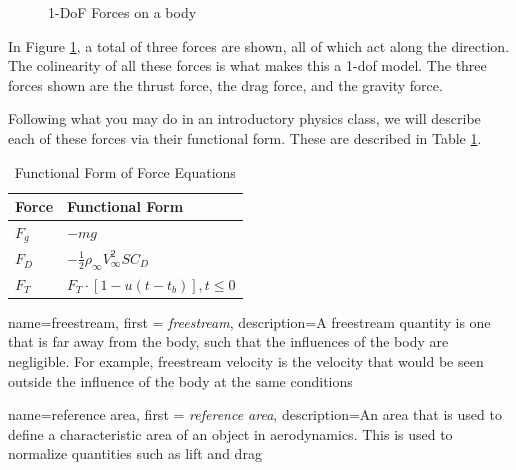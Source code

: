 \documentclass[12pt]{report}
\begin{document}
\begin{figure}[ht]
    \caption{1-DoF Forces on a body}
    \label{Figure 1}
\end{figure}

In Figure \ref{Figure 1}, a total of three forces are shown, all of which act along the  direction. The colinearity of all these forces is what makes this a 1-\gls{dof} model. The three forces shown are the thrust force, the drag force, and the gravity force.

Following what you may do in an introductory physics class, we will describe each of these forces via their functional form. These are described in Table \ref{Force Equations 1 DoF}. 

\begin{table}
\centering
\caption{Functional Form of Force Equations}
\label{Force Equations 1 DoF}
\begin{tabular}{l | l}
Force & Functional Form \\
\hline
 $F_g$&  $-mg$\\
 $F_D$&  $-\frac{1}{2} \rho_{\infty} V^2_{\infty}SC_D$\\
 $F_T$&  $F_T\cdot[1-u(t-t_b)], t\le0$\\

\end{tabular}

\end{table}
{
    name=freestream,
    first = {\textit{freestream}},
    description={A freestream quantity is one that is far away from the body, such that the influences of the body are negligible. For example, freestream velocity is the velocity that would be seen outside the influence of the body at the same conditions}
}

{
    name=reference area,
    first = \textit{reference area},
    description={An area that is used to define a characteristic area of an object in aerodynamics. This is used to normalize quantities such as lift and drag}
    }
\end{document}

